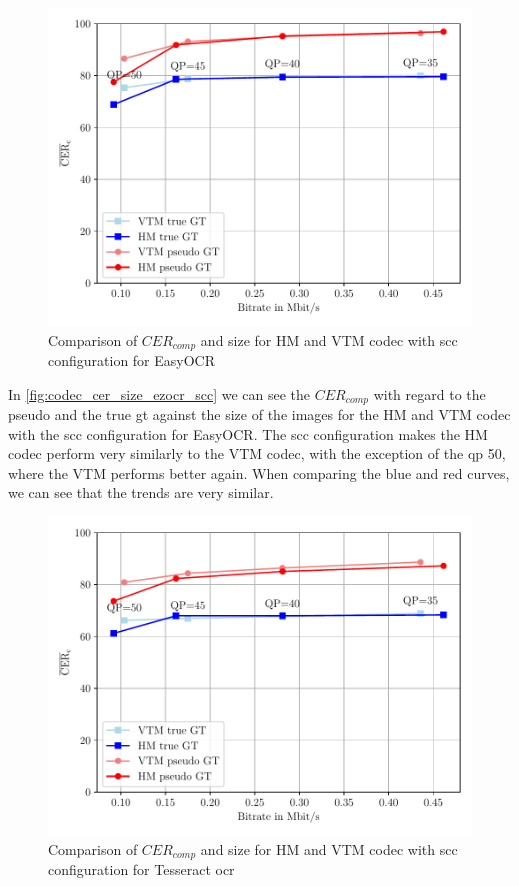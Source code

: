 \begin{figure}[h]
    \centering
    \includegraphics[width=\textwidth]{../images/analyze/codec_cer_size_ezocr_scc.pdf}
    \caption{Comparison of $CER_{comp}$ and size for HM and VTM codec with \gls{scc} configuration for EasyOCR}
    \label{fig:codec_cer_size_ezocr_scc}
\end{figure}

In \autoref{fig:codec_cer_size_ezocr_scc} we can see the $CER_{comp}$ with regard to the pseudo and the true \gls{gt} against the size of the images for the HM and VTM codec with the \gls{scc} configuration for EasyOCR.
The \gls{scc} configuration makes the HM codec perform very similarly to the VTM codec, with the exception of the \gls{qp} 50, where the VTM performs better again.
When comparing the blue and red curves, we can see that the trends are very similar.


\begin{figure}[h]
    \centering
    \includegraphics[width=\textwidth]{../images/analyze/codec_cer_size_tess_scc.pdf}
    \caption{Comparison of $CER_{comp}$ and size for HM and VTM codec with \gls{scc} configuration for Tesseract \gls{ocr}}
    \label{fig:codec_cer_size_tess_scc}
\end{figure}

